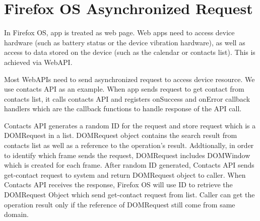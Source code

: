\documentclass[12pt]{article}
\begin{document}
\section*{Firefox OS Asynchronized Request}
In Firefox OS, app is treated as web page. Web apps need to access device hardware (such as battery status or the device vibration hardware), as well as access to data stored on the device (such as the calendar or contacts list). This is achieved via WebAPI. %

Most WebAPIs need to send asynchronized request to access device resource. We use contacts API as an example. When app sends request to get contact from contacts list,  it calls contacts API and registers onSuccess and onError callback handlers which are the callback functions to handle response of the API call. %

Contacts API generates a random ID for the request and store request which is a DOMRequest in a list. DOMRequest object contains the search result from contacts list as well as a reference to the operation's result. Addtionally, in order to identify which frame sends the request, DOMRequest includes DOMWindow which is created for each frame. After random ID generated, Contacts API sends get-contact request to system and return DOMRequest object to caller.  %
When Contacts API receives the response, Firefox OS will use ID to retrieve the DOMRequest Object which send get-contact request from list. Caller can get the operation result only if the reference of DOMRequest still come from same domain.  %
\end{document}
